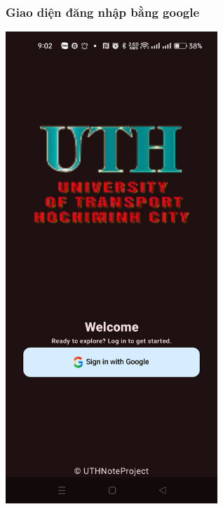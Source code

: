 \documentclass[a4paper,12pt]{article}
\begin{document}
\subsubsection{Giao diện đăng nhập bằng google}
\includegraphics[width=0.6\textwidth]{GiaoDienDangNhap.png}
\clearpage
\end{document}
